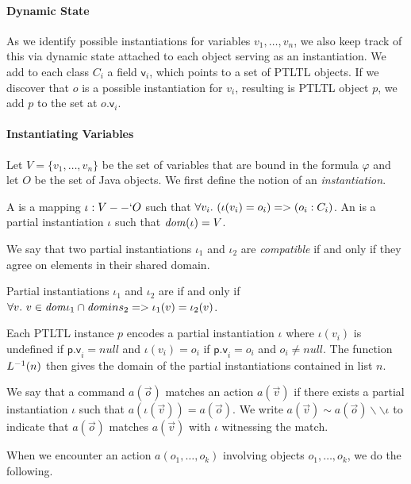 \documentclass{article}
\newcommand{\ltlform}{\varphi}
\newcommand{\p}[1]{\textsf{#1}}
\begin{document}
\paragraph{Dynamic State}
As we identify possible instantiations for variables $v_1,\ldots,v_n$, we also keep track of this via dynamic state attached to each object serving as an instantiation.  We add to each class $C_i$ a field $\p{v}_i$, which points to a set of PTLTL objects.
If we discover that $o$ is a possible instantiation for $v_i$, resulting is PTLTL object $p$, we add $p$ to the set at $o.\p{v}_i$.

\paragraph{Instantiating Variables}
\newcommand{\ins}{\iota}
Let $V = \{v_1,\ldots,v_n\}$ be the set of variables that are bound in the formula $\ltlform$ and let $O$ be the set of Java objects.
We first define the notion of an \textit{instantiation}.
\begin{defn}
A  is a mapping $\ins : V --` O$ such that $\A[v_i] (\ins(v_i) = o_i) \imp (o_i : C_i)$.  An  is a partial instantiation $\ins$ such that $\dom(\ins) = V$.
\end{defn}

We say that two partial instantiations $\ins_1$ and $\ins_2$ are \textit{compatible} if and only if they agree on elements in their shared domain.

\begin{defn}
Partial instantiations $\ins_1$ and $\ins_2$ are  if and only if $\A[v] v \in \dom{\ins_1} \cap \dom{ins_2} \imp \ins_1(v) = \ins_2(v)$.
\end{defn}

Each PTLTL instance $p$ encodes a partial instantiation $\ins$ where $\ins(v_i)$ is undefined if $\p{p.v}_i = null$ and $\ins(v_i) = o_i$ if $\p{p.v}_i = o_i$ and $o_i \neq null$.  The function $L^{-1}(n)$ then gives the domain of the partial instantiations contained in list $n$.

\newcommand{\match}{\sim}
\newcommand{\matout}{\backslash\backslash}
We say that a command $a(\vec{o})$ matches an action $a(\vec{v})$ if there exists a partial instantiation $\ins$ such that $a(\ins(\vec{v})) = a(\vec{o})$.  We write $a(\vec{v}) \match a(\vec{o}) \matout \ins$ to indicate that $a(\vec{o})$ matches $a(\vec{v})$ with $\ins$ witnessing the match.

When we encounter an action $a(o_1,\ldots,o_k)$ involving objects $o_1,\ldots,o_k$, we do the following.
\end{document}
